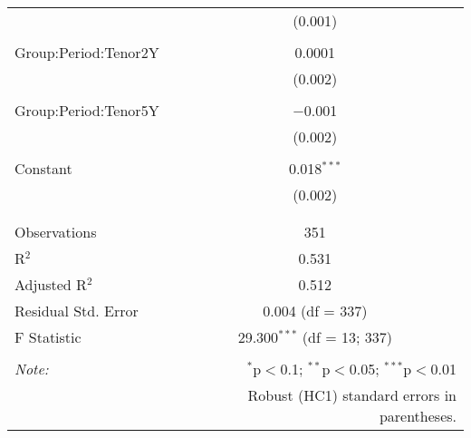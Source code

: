 \begin{table}[!htbp]
\begin{tabular}{@{\extracolsep{5pt}}lc}
  & (0.001) \\ 
  & \\ 
 Group:Period:Tenor2Y & 0.0001 \\ 
  & (0.002) \\ 
  & \\ 
 Group:Period:Tenor5Y & $-$0.001 \\ 
  & (0.002) \\ 
  & \\ 
 Constant & 0.018$^{***}$ \\ 
  & (0.002) \\ 
  & \\ 
\hline \\[-1.8ex] 
Observations & 351 \\ 
R$^{2}$ & 0.531 \\ 
Adjusted R$^{2}$ & 0.512 \\ 
Residual Std. Error & 0.004 (df = 337) \\ 
F Statistic & 29.300$^{***}$ (df = 13; 337) \\ 
\hline 
\hline \\[-1.8ex] 
\textit{Note:}  & \multicolumn{1}{r}{$^{*}$p$<$0.1; $^{**}$p$<$0.05; $^{***}$p$<$0.01} \\ 
 & \multicolumn{1}{r}{Robust (HC1) standard errors in parentheses.} \\ 
\end{tabular} 
\end{table} 
